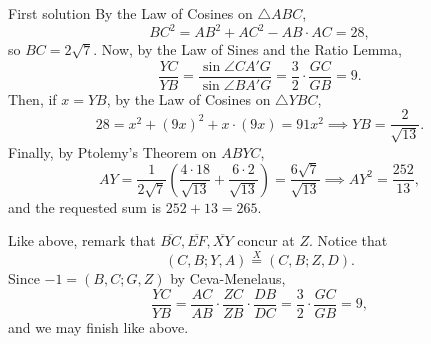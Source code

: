 \begin{customenv}{First solution}
    By the Law of Cosines on $\triangle ABC$, \[BC^2=AB^2+AC^2-AB\cdot AC=28,\]
    so $BC=2\sqrt7$. Now, by the Law of Sines and the Ratio Lemma, \[\frac{YC}{YB}=\frac{\sin\angle CA'G}{\sin\angle BA'G}=\frac32\cdot\frac{GC}{GB}=9.\]
    Then, if $x=YB$, by the Law of Cosines on $\triangle YBC$, \[28=x^2+(9x)^2+x\cdot(9x)=91x^2\implies YB=\frac2{\sqrt{13}}.\]
    Finally, by Ptolemy's Theorem on $ABYC$, \[AY=\frac1{2\sqrt7}\left(\frac{4\cdot 18}{\sqrt{13}}+\frac{6\cdot 2}{\sqrt{13}}\right)=\frac{6\sqrt{7}}{\sqrt{13}}\implies AY^2=\frac{252}{13},\]
    and the requested sum is $252+13=265$.
    \begin{boxremark}
        Like above, remark that $\overline{BC},\overline{EF},\overline{XY}$ concur at $Z$. Notice that \[(C,B;Y,A)\stackrel{X}{=}(C,B;Z,D).\]
        Since $-1=(B,C;G,Z)$ by Ceva-Menelaus, \[\frac{YC}{YB}=\frac{AC}{AB}\cdot\frac{ZC}{ZB}\cdot\frac{DB}{DC}=\frac32\cdot\frac{GC}{GB}=9,\]
        and we may finish like above.
    \end{boxremark}
\end{customenv}
